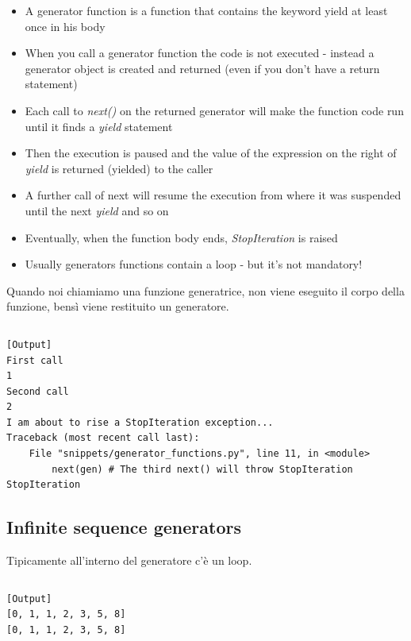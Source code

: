  \begin{itemize}
    \item A \alert{generator function} is a function that contains the keyword \alert{yield} at
          least once in his body
    \item When you call a generator function the code is not executed - instead
          a generator object is created and returned (even if you don't have a return statement)
    \item Each call to \emph{next()} on the returned generator will make the function code 
          run until it finds a \emph{yield} statement
    \item Then the execution is paused and the value of the expression on the right 
          of \emph{yield} is returned (yielded) to the caller
    \item A further call of next will resume the execution from where it was suspended
          until the next \emph{yield} and so on
    \item Eventually, when the function body ends, \emph{StopIteration} is raised
    \item Usually generators functions contain a loop - but it's not mandatory!
  \end{itemize}

Quando noi chiamiamo una funzione generatrice, non viene eseguito il corpo della funzione, bensì viene restituito un generatore.

\inputminted{python}{snippets/generator_functions.py}

\begin{verbatim}
[Output]
First call
1
Second call
2
I am about to rise a StopIteration exception...
Traceback (most recent call last):
    File "snippets/generator_functions.py", line 11, in <module>
        next(gen) # The third next() will throw StopIteration
StopIteration
\end{verbatim}


\subsection{Infinite sequence generators}

Tipicamente all'interno del generatore c'è un loop.

\inputminted{python}{snippets/fibonacci.py}

\begin{verbatim}
[Output]
[0, 1, 1, 2, 3, 5, 8]
[0, 1, 1, 2, 3, 5, 8]
\end{verbatim}

